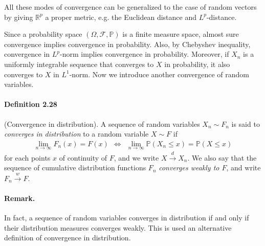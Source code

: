 \documentclass{article}
\numberwithin{equation}{section}
\renewcommand{\P}{\mathbb{P}}
\theoremstyle{plain}
\theoremstyle{definition}
\begin{document}
All these modes of convergence can be generalized to the case of random vectors by giving $\mathbb{R}^p$ a proper metric, e.g. the Euclidean distance and $L^p$-distance.

Since a probability space $(\Omega,\mathscr{F},\P)$ is a finite measure space, almost sure convergence implies convergence in probability. Also, by Chebyshev inequality, convergence in $L^p$-norm implies convergence in probability. Moreover, if $X_n$ is a uniformly integrable sequence that converges to $X$ in probability, it also converges to $X$ in $L^1$-norm. Now we introduce another convergence of random variables.

\paragraph{Definition 2.28\label{def:2.28}} (Convergence in distribution). A sequence of random variables $X_n\sim F_n$ is said to \textit{converges in distribution} to a random variable $X\sim F$ if
\begin{align*}
	\lim_{n\to\infty}F_n(x) = F(x)\ \ \Leftrightarrow\ \ \lim_{n\to\infty}\P(X_n\leq x) = \P(X\leq x)
\end{align*}
for each points $x$ of continuity of $F$, and we write $X\overset{d}{\to} X_n$. We also say that the sequence of cumulative distribution functions $F_n$ \textit{converges weakly to $F$}, and write $F_n\overset{w}{\to} F$.

\paragraph{Remark.} In fact, a sequence of random variables converges in distribution if and only if their distribution measures converges weakly. This is used an alternative definition of convergence in distribution.
\end{document}
